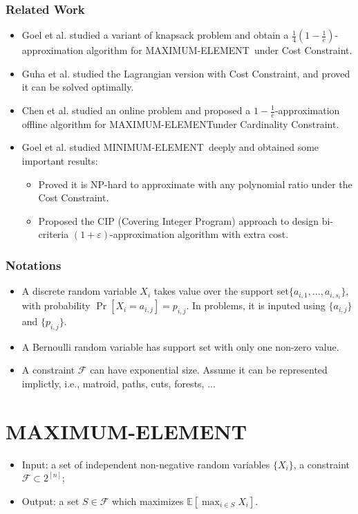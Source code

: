 \documentclass{beamer}
\newcommand{\calF}{{\mathcal F}}
\newcommand{\Exp}{{\mathbb{E}}}
\newcommand{\MM}{{\textsf{MAXIMUM-ELEMENT}}}
\newcommand{\mm}{{\textsf{MINIMUM-ELEMENT}}}
\newcommand{\etal}{et al. }
\begin{document}
\begin{frame}
\frametitle{Related Work}
\begin{itemize}
    \item Goel \etal studied a variant of knapsack problem and obtain a $\frac{1}{4}(1 - \frac{1}{e})$-approximation algorithm for \MM\ under Cost Constraint.\cite{Goel:asking}
    \item Guha \etal studied the Lagrangian version with Cost Constraint, and proved it can be solved optimally.\cite{Guha07informationacquisition}
    \item Chen \etal studied an online problem and proposed a $1-\frac{1}{e}$-approximation offline algorithm for \MM under Cardinality Constraint.\cite{NIPS2016:MAB}
    \item Goel \etal studied \mm\ deeply and obtained some important results:\cite{Goel:probe}
    \begin{itemize}
        \item Proved it is NP-hard to approximate with any polynomial ratio under the Cost Constraint.
        \item Proposed the CIP (Covering Integer Program) approach to design bi-criteria $(1+\varepsilon)$-approximation algorithm with extra cost.
    \end{itemize}
\end{itemize}
\end{frame}

\begin{frame}
    \frametitle{Notations}
    \begin{itemize}
        \item A discrete random variable $X_i$ takes value over the support set$\{a_{i,1}, \ldots, a_{i, s_i}\}$, with probability $\Pr[X_i = a_{i,j}] = p_{i,j}$. In problems, it is inputed using $\{a_{i,j}\}$ and $\{p_{i,j}\}$.
        \item A Bernoulli random variable has support set with only one non-zero value.
        \item A constraint $\calF$ can have exponential size. Assume it can be represented implictly, i.e., matroid, paths, cuts, forests, ...
    \end{itemize}
\end{frame}

\section{MAXIMUM-ELEMENT}

\begin{frame}
    \begin{problem}[\MM]
        \begin{itemize}
            \item Input: a set of independent non-negative random variables $\{X_i\}$, a constraint $\calF \subset 2^{[n]}$;
            \item Output: a set $S\in \calF$ which maximizes $\Exp[\max_{i\in S} X_i]$.
        \end{itemize}
    \end{problem}
\end{frame}
\end{document}

